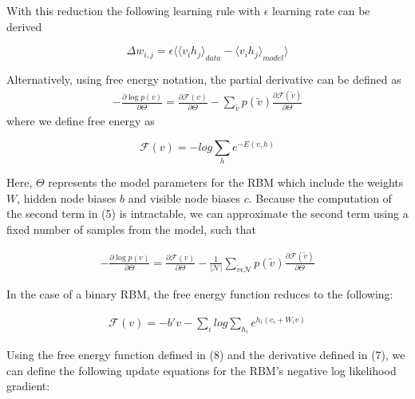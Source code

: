 \documentclass[journal]{IEEEtran}
\begin{document}
With this reduction the following learning rule with $\epsilon$ learning rate can be derived

\begin{equation}
\Delta w_{i,j} = \epsilon\langle{\langle v_{i} h_{j} \rangle}_{data} - {\langle v_{i} h_{j} \rangle}_{model}\rangle 
\end{equation} 

Alternatively, using free energy notation, the partial derivative can be defined as
\begin{equation}
\begin{aligned}
- \frac{\partial \log p(v)}{\partial \Theta} = \frac{\partial \mathcal{F}(v)}{\partial \Theta} - \sum\limits_{\tilde{v}}p(\tilde{v}) \frac{\partial \mathcal{F}(\tilde{v})}{\partial \Theta}
\end{aligned}
\end{equation} where we define free energy as 

\begin{equation}
\mathcal{F}(v) = -log \sum\limits_{h}e^{-E(v,h)}
\end{equation} 

Here, $\Theta$ represents the model parameters for the RBM which include the weights $W$, hidden node biases $b$ and visible node biases $c$. Because the computation of the second term in (5) is intractable, we can approximate the second term using a fixed number of samples from the model, such that 

\begin{equation}
\begin{aligned}
- \frac{\partial \log p(v)}{\partial \Theta} = \frac{\partial \mathcal{F}(v)}{\partial \Theta} -\frac{1}{|\mathcal{N}|} \sum\limits_{\tilde{v} \epsilon \mathcal{N}} p(\tilde{v}) \frac{\partial \mathcal{F}(\tilde{v})}{\partial \Theta}
\end{aligned}
\end{equation}

In the case of a binary RBM, the free energy function reduces to the following:

\begin{equation}
\begin{aligned}
\mathcal{F}(v) = -b'v - \sum\limits_{i}log\sum\limits_{h_{i}}e^{h_{i}(c_{i}+W_{i}v)}
\end{aligned}
\end{equation}

Using the free energy function defined in (8) and the derivative defined in (7), we can define the following update equations for the RBM's negative log likelihood gradient:
\end{document}
